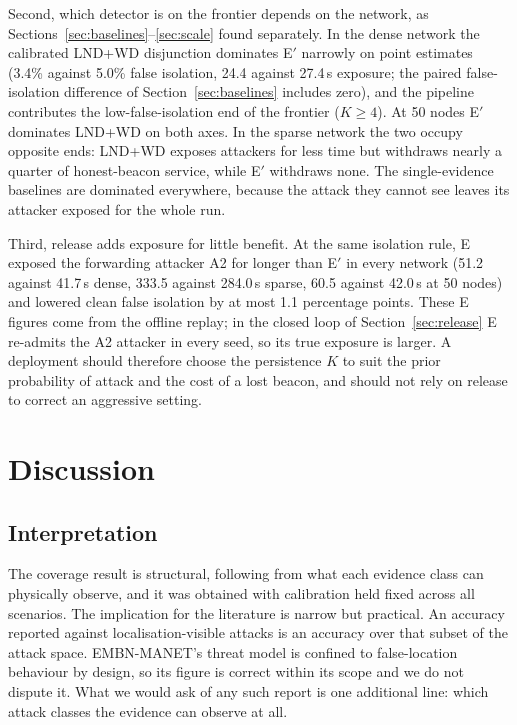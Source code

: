 \documentclass[pdflatex,sn-mathphys-num]{sn-jnl}%
\theoremstyle{thmstyleone}%
\theoremstyle{thmstyletwo}%
\theoremstyle{thmstylethree}%
\begin{document}
Second, which detector is on the frontier depends on the network, as
Sections~\ref{sec:baselines}--\ref{sec:scale} found separately. In the dense
network the calibrated LND+WD disjunction dominates E$'$ narrowly on point
estimates (3.4\% against 5.0\% false isolation, 24.4 against 27.4\,s
exposure; the paired false-isolation difference of Section~\ref{sec:baselines}
includes zero), and the
pipeline contributes the low-false-isolation end of the frontier ($K \ge 4$).
At 50 nodes E$'$ dominates LND+WD on both axes. In the sparse network the two
occupy opposite ends: LND+WD exposes attackers for less time but withdraws
nearly a quarter of honest-beacon service, while E$'$ withdraws none. The
single-evidence baselines are dominated everywhere, because the attack they
cannot see leaves its attacker exposed for the whole run.

Third, release adds exposure for little benefit. At the same isolation rule,
E exposed the forwarding attacker A2 for longer than E$'$ in every network
(51.2 against 41.7\,s dense, 333.5 against 284.0\,s sparse, 60.5 against
42.0\,s at 50 nodes) and lowered clean false isolation by at most 1.1
percentage points. These E figures come from the offline replay; in the closed
loop of Section~\ref{sec:release} E re-admits the A2 attacker in every seed,
so its true exposure is larger. A deployment should therefore choose the
persistence $K$ to suit the prior probability of attack and the cost of a lost
beacon, and should not rely on release to correct an aggressive setting.

\section{Discussion}
\label{sec:discussion}

\subsection{Interpretation}

The coverage result is structural, following from what each evidence class can
physically observe, and it was obtained
with calibration held fixed across all scenarios. The implication for the
literature is narrow but practical. An accuracy reported against
localisation-visible attacks is an accuracy over that subset of the attack
space. EMBN-MANET's threat model is confined to false-location behaviour by
design, so its figure is correct within its scope and we do not dispute it.
What we would ask of any such report is one additional line: which attack
classes the evidence can observe at all.
\end{document}
